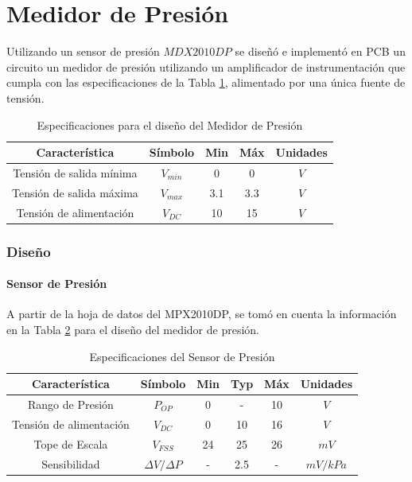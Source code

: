 \part{Medidor de Presión}
Utilizando un sensor de presión $MDX2010DP$ se diseñó e implementó en PCB un circuito un medidor de presión utilizando un amplificador de instrumentación que cumpla con las especificaciones de la Tabla \ref{e4:tab_specs}, alimentado por una única fuente de tensión.

\begin{table}[ht]
\begin{center}
\begin{tabular}{||c|c||c|c|c||}
\hline
Característica				&Símbolo	&Min	&Máx	&Unidades \\
\hline
Tensión de salida mínima	&$V_{min}$	&0		&0		&$V$ \\
Tensión de salida máxima	&$V_{max}$	&3.1	&3.3	&$V$ \\
Tensión de alimentación		&$V_{DC}$	&10		&15		&$V$ \\
\hline
\end{tabular}
\caption{Especificaciones para el diseño del Medidor de Presión}
\label{e4:tab_specs}
\end{center}
\end{table}

\section{Diseño}
\subsection{Sensor de Presión}
A partir de la hoja de datos del MPX2010DP, se tomó en cuenta la información en la Tabla \ref{e4:tab_sensor_specs} para el diseño del medidor de presión.

\begin{table}[ht]
\begin{center}
\begin{tabular}{||c|c||c|c|c|c||}
\hline
Característica				&Símbolo				&Min		&Typ	&Máx		&Unidades \\
\hline
Rango de Presión			&$P_{OP}$				&0		&-	&10		&$V$ \\
Tensión de alimentación		&$V_{DC}$				&0		&10	&16		&$V$ \\
Tope de Escala				&$V_{FSS}$			&24		&25	&26		&$mV$ \\
Sensibilidad				&$\Delta V / \Delta P$ 	&-		&2.5	&-		&$mV/kPa$\\
\hline
\end{tabular}
\caption{Especificaciones del Sensor de Presión}
\label{e4:tab_sensor_specs}
\end{center}
\end{table}

